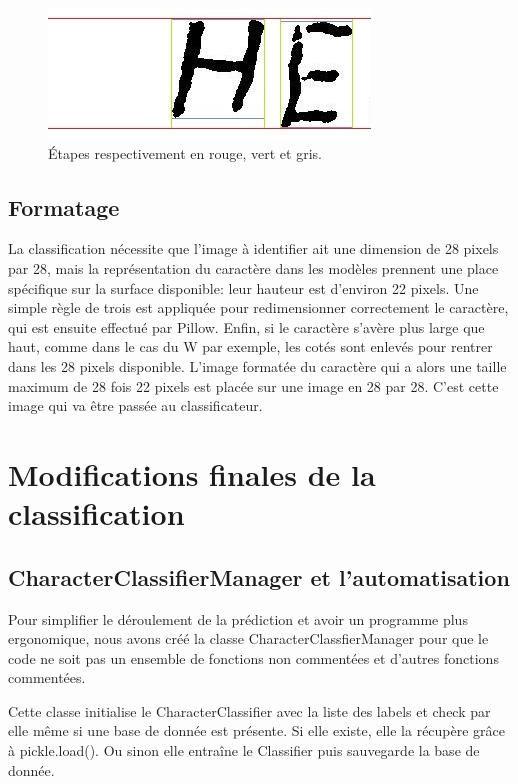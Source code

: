 \documentclass[a4paper, 12pt]{article}
\begin{document}
\begin{figure}[!ht]
\centering
\includegraphics[scale=1]{img/reanalyse.jpg}
\caption{Étapes respectivement en rouge, vert et gris.}
\end{figure}

\subsection{Formatage}
La classification nécessite que l'image à identifier ait une dimension de 28 pixels par 28, mais la représentation du caractère dans les modèles prennent une place spécifique sur la surface disponible: leur hauteur est d'environ 22 pixels. Une simple règle de trois est appliquée pour redimensionner correctement le caractère, qui est ensuite effectué par Pillow. Enfin, si le caractère s'avère plus large que haut, comme dans le cas du W par exemple, les cotés sont enlevés pour rentrer dans les 28 pixels disponible. L'image formatée du caractère qui a alors une taille maximum de 28 fois 22 pixels est placée sur une image en 28 par 28. C'est cette image qui va être passée au classificateur.

\section{Modifications finales de la classification}

\subsection{CharacterClassifierManager et l’automatisation}
Pour simplifier le déroulement de la prédiction et avoir un programme plus ergonomique, nous avons créé la classe CharacterClassfierManager pour que le code ne soit pas un ensemble de fonctions non commentées et d'autres fonctions commentées.

Cette classe initialise le CharacterClassifier avec la liste des labels et check par elle même si une base de donnée est présente. Si elle existe, elle la récupère grâce à pickle.load(). Ou sinon elle entraîne le Classifier puis sauvegarde la base de donnée.
\end{document}

